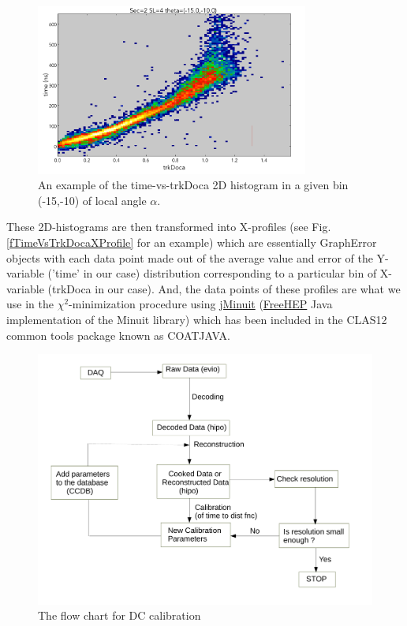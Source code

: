 \documentclass[12pt]{article}
\begin{document}
\begin{figure}
    \centering
    \includegraphics[width=0.8\textwidth]{Figures/time_vs_trkDocaExample_Sec2_SL4_th_m15_m10.png}
    \caption{An example of the time-vs-trkDoca 2D histogram in a given bin (-15,-10) of local angle $\alpha$.}
    \label{fTimeVsTrkDoca}
\end{figure}


These 2D-histograms are then transformed into X-profiles (see Fig. \ref{fTimeVsTrkDocaXProfile} for an example)  which are essentially GraphError objects with each data point made out of the average value and error of the Y-variable ('time' in our case) distribution corresponding to a particular bin of X-variable (trkDoca in our case). And, the data points of these profiles are what we use in the $\chi^2$-minimization procedure using \href{http://java.freehep.org/freehep-jminuit/}{jMinuit} (\href{http://java.freehep.org/}{FreeHEP} Java implementation of the Minuit library) which has been included in the CLAS12 common tools package known as COATJAVA.

\begin{figure}[htb]
    \centering
    \includegraphics[width=6.0in]{Figures/DC_Cal_Flow_Chart.pdf}
    \caption{The flow chart for DC calibration}\label{}
\end{figure}
\end{document}
